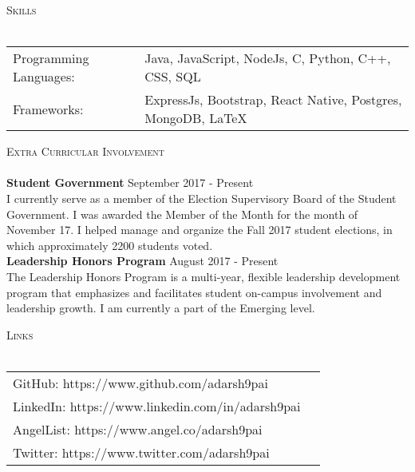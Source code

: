\documentclass[a4paper]{article}
\newcommand{\lineunder} {
    \vspace*{-8pt} \\
    \hspace*{-18pt} \hrulefill \\
}
\newcommand{\header} [1] {
    {\hspace*{-18pt}\vspace*{6pt} \textsc{#1}}
    \vspace*{-6pt} \lineunder
}
\begin{document}
\header{Skills}
\begin{tabular}{ l l }
	Programming Languages: & Java, JavaScript, NodeJs, C, Python, C++, CSS, SQL    \\
	Frameworks:            & ExpressJs, Bootstrap, React Native, Postgres, MongoDB, LaTeX \\
\end{tabular}
\vspace{2mm}


\header{Extra Curricular Involvement}
\textbf{Student Government} \hfill September 2017 - Present\\
I currently serve as a member of the Election Supervisory Board of the Student Government. I was awarded the Member of the Month for the month of November \textquotesingle{}17. I helped manage and organize the Fall 2017 student elections, in which approximately 2200 students voted.\\
\vspace*{2mm}
\textbf{Leadership Honors Program} \hfill August 2017 - Present\\
The Leadership Honors Program is a multi-year, flexible leadership development program that emphasizes and facilitates student on-campus involvement and leadership growth. I am currently a part of the Emerging level.\\
\vspace*{2mm}

\header{Links}
\vspace{2mm} 
\begin{tabular}{ l l }
	GitHub: https://www.github.com/adarsh9pai   \\
    LinkedIn: https://www.linkedin.com/in/adarsh9pai   \\
    AngelList: https://www.angel.co/adarsh9pai   \\
    Twitter: https://www.twitter.com/adarsh9pai   \\
	
\end{tabular}
\vspace{2mm}

\ 
\end{document}

